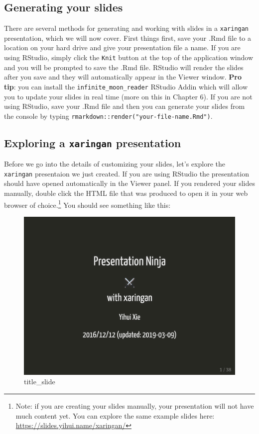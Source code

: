 \documentclass[
]{book}
\begin{document}
\hypertarget{generating-your-slides}{%
\subsection{Generating your slides}\label{generating-your-slides}}

There are several methods for generating and working with slides in a \texttt{xaringan} presentation, which we will now cover. First things first, save your .Rmd file to a location on your hard drive and give your presentation file a name. If you are using RStudio, simply click the \texttt{Knit} button at the top of the application window and you will be prompted to save the .Rmd file. RStudio will render the slides after you save and they will automatically appear in the Viewer window. \textbf{Pro tip}: you can install the \texttt{infinite\_moon\_reader} RStudio Addin which will allow you to update your slides in real time (more on this in Chapter 6). If you are not using RStudio, save your .Rmd file and then you can generate your slides from the console by typing \texttt{rmarkdown::render("your-file-name.Rmd")}.

\hypertarget{exploring-a-xaringan-presentation}{%
\subsection{\texorpdfstring{Exploring a \texttt{xaringan} presentation}{Exploring a xaringan presentation}}\label{exploring-a-xaringan-presentation}}

Before we go into the details of customizing your slides, let's explore the \texttt{xaringan} presentaion we just created. If you are using RStudio the presentation should have opened automatically in the Viewer panel. If you rendered your slides manually, double click the HTML file that was produced to open it in your web browser of choice.\footnote{Note: if you are creating your slides manually, your presentation will not have much content yet. You can explore the same example slides here: \url{https://slides.yihui.name/xaringan/}} You should see something like this:

\begin{figure}
\centering
\includegraphics{img/02_title-slide.png}
\caption{title\_slide}
\end{figure}
\end{document}
